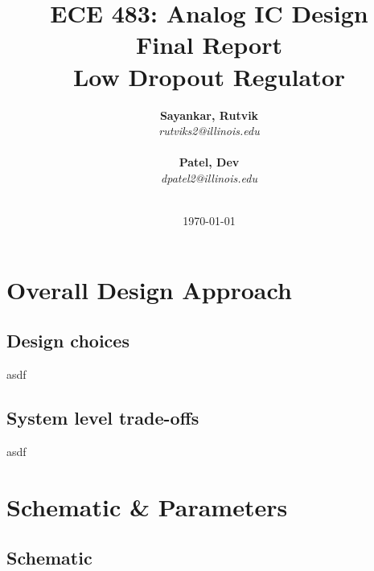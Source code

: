 \documentclass{report}
\title{ECE 483: Analog IC Design \\ Final Report \\ Low Dropout Regulator} %
\author {
    \textbf{Sayankar, Rutvik}\\
    \textit{rutviks2@illinois.edu} \\
    \hfill \\ 
    \textbf{Patel, Dev}\\
    \textit{dpatel2@illinois.edu} \\
    \hfill \\ 
}
\date{\today} %
\begin{document}
    \maketitle %
    
    \pagebreak


    \chapter{Overall Design Approach}
    \section{Design choices}
    asdf

    \section{System level trade-offs}
    asdf

    \chapter{Schematic \& Parameters}
    \section{Schematic}
\end{document}

